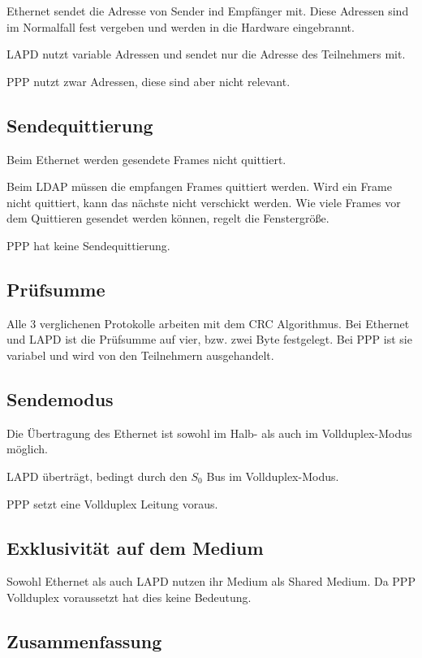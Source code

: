 \documentclass[12pt, a4paper, ngerman]{article}
\begin{document}
Ethernet sendet die Adresse von Sender ind Empfänger mit. Diese Adressen sind im Normalfall fest vergeben und werden in die Hardware eingebrannt.

LAPD nutzt variable Adressen und sendet nur die Adresse des Teilnehmers mit.

PPP nutzt zwar Adressen, diese sind aber nicht relevant.

\subsection{Sendequittierung}
Beim Ethernet werden gesendete Frames nicht quittiert. 

Beim LDAP müssen die empfangen Frames quittiert werden. Wird ein Frame nicht quittiert, kann das nächste nicht verschickt werden. Wie viele Frames vor dem Quittieren gesendet werden können, regelt die Fenstergröße.

PPP hat keine Sendequittierung.

\subsection{Prüfsumme} 
Alle 3 verglichenen Protokolle arbeiten mit dem CRC Algorithmus. Bei Ethernet und LAPD ist die Prüfsumme auf vier, bzw. zwei Byte festgelegt. Bei PPP ist sie variabel und wird von den Teilnehmern ausgehandelt. 

\subsection{Sendemodus}
Die Übertragung des Ethernet ist sowohl im Halb- als auch im Vollduplex-Modus möglich. 

LAPD überträgt, bedingt durch den $S_0$ Bus im Vollduplex-Modus.

PPP setzt eine Vollduplex Leitung voraus.

\subsection{Exklusivität auf dem Medium}
Sowohl Ethernet als auch LAPD nutzen ihr Medium als Shared Medium.
Da PPP Vollduplex voraussetzt hat dies keine Bedeutung.

\subsection{Zusammenfassung}
\end{document}

